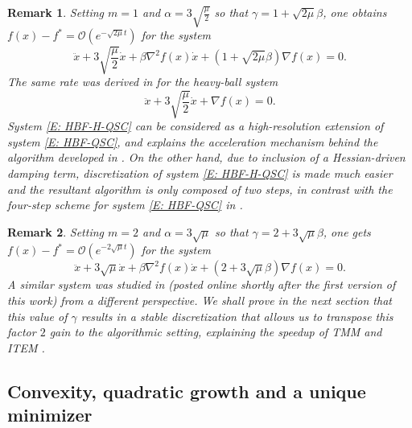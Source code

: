 \documentclass[pdflatex,sn-mathphys-num]{sn-jnl}
\theoremstyle{thmstyleone}
\theoremstyle{thmstyletwo}
\newtheorem{remark}{Remark}
\theoremstyle{thmstylethree}
\begin{document}
\begin{remark}
Setting $m=1$ and $\alpha = 3\sqrt{\frac{\mu}{2}}$ so that $\gamma = 1 + \sqrt{2\mu}\beta$, one obtains $f(x) - f^* = \mathcal{O}\left( e^{-\sqrt{2\mu}t} \right)$ for the system
\begin{equation}\label{E: HBF-H-QSC}
\ddot{x} + 3\sqrt{\frac{\mu}{2}} \dot{x} + \beta\nabla^2 f(x) \dot{x} + \left( 1 + \sqrt{2\mu}\beta \right)\nabla f(x) = 0.
\end{equation}
The same rate was derived in \cite[Theorem 3.2]{Aujol_2022} for the heavy-ball system 
\begin{equation}\label{E: HBF-QSC}
\ddot{x} + 3\sqrt{\frac{\mu}{2}} \dot{x} + \nabla f(x) = 0.
\end{equation}
System \eqref{E: HBF-H-QSC} can be  considered as a high-resolution extension of system \eqref{E: HBF-QSC}, and explains the acceleration mechanism behind the algorithm developed in \cite{Aujol_2022}. On the other hand, due to inclusion of a Hessian-driven damping term, discretization of system \eqref{E: HBF-H-QSC} is made much easier and the resultant algorithm is only composed of two steps, in contrast with the four-step scheme for system \eqref{E: HBF-QSC} in \cite{Aujol_2022}.    
\end{remark}


\begin{remark}
Setting $m=2$ and $\alpha = 3\sqrt{\mu}$ so that $\gamma = 2 + 3\sqrt{\mu}\beta$, one gets $f(x) - f^* = \mathcal{O}\left( e^{-2\sqrt{\mu}t} \right)$ for the system
\begin{equation}\label{E: HBF-H-fastest}
\ddot{x} + 3\sqrt{\mu}\dot{x} + \beta\nabla^2 f(x) \dot{x} + \left( 2 + 3\sqrt{\mu}\beta \right)\nabla f(x) = 0.
\end{equation}
A similar system was studied in \cite{Yurtsever_2025} (posted online shortly after the first version of this work) from a different perspective. We shall prove in the next section that this value of $\gamma$ results in a stable discretization that allows us to transpose this factor $2$ gain to the algorithmic setting, explaining the speedup of TMM \cite{Scoy_2018} and ITEM \cite{Taylor_2023_optimal}.  
\end{remark}



\subsection{Convexity, quadratic growth and a unique minimizer} \label{SS:quadunique}
\end{document}
